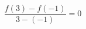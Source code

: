 \documentclass[preview]{standalone}
\begin{document}
\begin{align*}
\dfrac{f(3) - f(-1)}{3 - (-1)} = 0
\end{align*}
\end{document}
